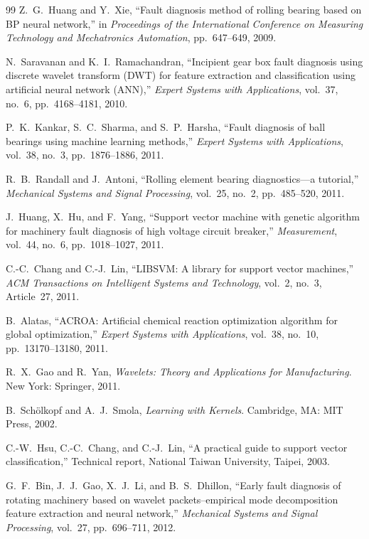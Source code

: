 \begin{thebibliography}{99}
Z.~G.~Huang and Y.~Xie,
``Fault diagnosis method of rolling bearing based on BP neural network,''
in \textit{Proceedings of the International Conference on Measuring Technology and Mechatronics Automation}, pp.~647--649, 2009.

N.~Saravanan and K.~I.~Ramachandran,
``Incipient gear box fault diagnosis using discrete wavelet transform (DWT) for feature extraction and classification using artificial neural network (ANN),''
\textit{Expert Systems with Applications}, vol.~37, no.~6, pp.~4168--4181, 2010.

P.~K.~Kankar, S.~C.~Sharma, and S.~P.~Harsha,
``Fault diagnosis of ball bearings using machine learning methods,''
\textit{Expert Systems with Applications}, vol.~38, no.~3, pp.~1876--1886, 2011.

R.~B.~Randall and J.~Antoni,
``Rolling element bearing diagnostics---a tutorial,''
\textit{Mechanical Systems and Signal Processing}, vol.~25, no.~2, pp.~485--520, 2011.

J.~Huang, X.~Hu, and F.~Yang,
``Support vector machine with genetic algorithm for machinery fault diagnosis of high voltage circuit breaker,''
\textit{Measurement}, vol.~44, no.~6, pp.~1018--1027, 2011.

C.-C.~Chang and C.-J.~Lin,
``LIBSVM: A library for support vector machines,''
\textit{ACM Transactions on Intelligent Systems and Technology}, vol.~2, no.~3, Article~27, 2011.

B.~Alatas,
``ACROA: Artificial chemical reaction optimization algorithm for global optimization,''
\textit{Expert Systems with Applications}, vol.~38, no.~10, pp.~13170--13180, 2011.

R.~X.~Gao and R.~Yan,
\textit{Wavelets: Theory and Applications for Manufacturing}.
New York: Springer, 2011.

B.~Sch\"olkopf and A.~J.~Smola,
\textit{Learning with Kernels}.
Cambridge, MA: MIT Press, 2002.

C.-W.~Hsu, C.-C.~Chang, and C.-J.~Lin,
``A practical guide to support vector classification,''
Technical report, National Taiwan University, Taipei, 2003.

G.~F.~Bin, J.~J.~Gao, X.~J.~Li, and B.~S.~Dhillon,
``Early fault diagnosis of rotating machinery based on wavelet packets--empirical mode decomposition feature extraction and neural network,''
\textit{Mechanical Systems and Signal Processing}, vol.~27, pp.~696--711, 2012.


\end{thebibliography}
